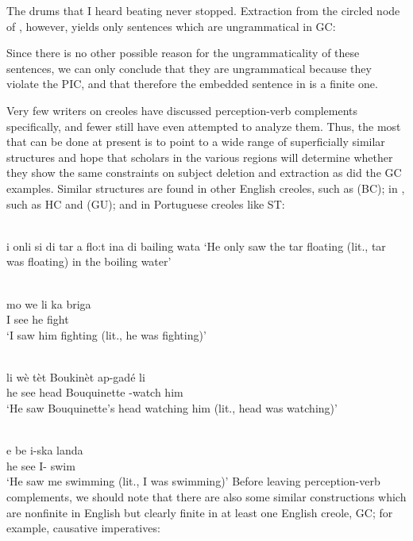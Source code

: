\ea\label{ex:2:145}
 The drums that I heard beating never stopped.
\z
Extraction from the circled node of , however, yields only sentences which are ungrammatical in GC:

\z

\z

\z
Since there is no other possible reason for the ungrammaticality of these sentences, we can only conclude that they are ungrammatical because they violate the PIC, and that therefore the embedded sentence in  is a finite one.


Very few writers on creoles have discussed perception-verb com\-plements specifically, and fewer still have even attempted to analyze them. Thus, the most that can be done at present is to point to a wide range of superficially similar structures and hope that scholars in the various regions will determine whether they show the same constraints on subject deletion and extraction as did the GC examples. Similar structures are found in other English creoles, such as  (BC); in , such as HC and  (GU); and in Portuguese creoles like ST:

\ea\label{ex:2:149}
\ili{\langBC}{}{}\\
i onli si di tar a flo:t ina di bailing wata
\glt `He only saw the tar floating (lit., tar was floating) in the boiling water'
\z

\ea\label{ex:2:150}
\ili{\langGU}{}{}\\
 \gll mo we li ka briga\\
I see he {\ASP} fight\\
\glt `I saw him fighting (lit., he was fighting)'
\z

\ea\label{ex:2:151}
\ili{\langHC}{}{}\\
\gll li wè tèt Boukinèt ap-gadé li\\
he see head Bouquinette \ASP-watch him \\
\glt `He saw Bouquinette's head watching him (lit., head was watching)'
\z

\ea\label{ex:2:152}
\ili{\langST}{}{}\\
\gll e be i-ska landa\\
he see {I-\ASP} swim\\
\glt `He saw me swimming (lit., I was swimming)'
\z
Before leaving perception-verb complements, we should note that there are also some similar constructions which are nonfinite in English but clearly finite in at least one English creole, GC; for example, causative imperatives:

